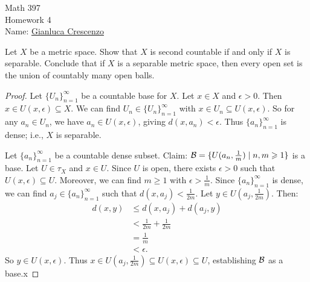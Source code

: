 \documentclass[11pt,twoside,openany]{memoir}
\begin{document}
\begin{center}
{\large Math 397 \\[0.1in]Homework 4 \\[0.1in]}
{Name:} {\underline{Gianluca Crescenzo\hspace*{2in}}}\\[0.15in]
\end{center}
\vspace{4pt}
    \begin{exercise}
        Let $X$ be a metric space. Show that $X$ is second countable if and only if $X$ is separable. Conclude that if $X$ is a separable metric space, then every open set is the union of countably many open balls.
    \end{exercise}
        \begin{proof}
            Let $\{U_n\}_{n = 1}^\infty$ be a countable base for $X$. Let $x \in X$ and $\epsilon > 0$. Then $x \in U(x,\epsilon) \subseteq X$. We can find $U_n \in \{U_n\}_{n = 1}^\infty$ with $x \in U_n \subseteq U(x,\epsilon)$. So for any $a_n \in U_n$, we have $a_n \in U(x,\epsilon)$, giving $d(x,a_n) < \epsilon$. Thus $\{a_n\}_{n = 1}^\infty$ is dense; i.e., $X$ is separable.

            Let $\{a_n\}_{n = 1}^\infty$ be a countable dense subset. Claim: $\mathcal{B} = \{U(a_n,\frac{1}{m}) \mid n,m \geqslant 1\}$ is a base. Let $U \in \tau_X$ and $x \in U$. Since $U$ is open, there exists $\epsilon > 0$ such that $U(x,\epsilon) \subseteq U$. Moreover, we can find $m \geq 1$ with $\epsilon > \frac{1}{m}$. Since $\{a_n\}_{n = 1}^\infty$ is dense, we can find $a_j \in \{a_n\}_{n = 1}^\infty$ such that $d(x,a_j) < \frac{1}{2m}$. Let $y \in U(a_j,\frac{1}{2m})$. Then:
                \begin{equation*}
                \begin{split}
                    d(x,y)
                    & \leq d(x,a_j) + d(a_j,y) \\
                    & < \frac{1}{2m} + \frac{1}{2m} \\
                    & = \frac{1}{m} \\
                    & < \epsilon.
                \end{split}
                \end{equation*}
            So $y \in U(x,\epsilon)$. Thus $x \in U(a_j,\frac{1}{2m}) \subseteq U(x,\epsilon) \subseteq U$, establishing $\mathcal{B}$ as a base.x
        \end{proof}
\end{document}

